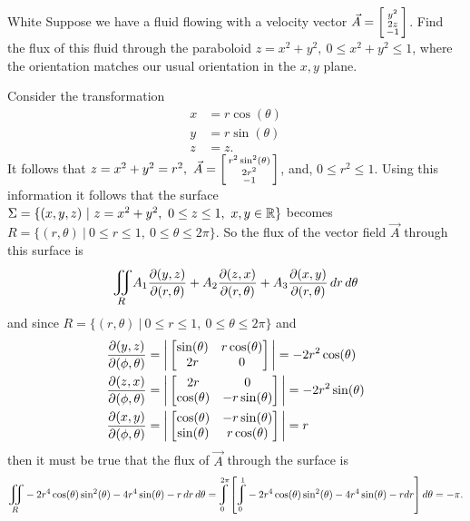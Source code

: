 \documentclass[titlepage]{article}
\begin{document}
\clearpage
\begin{cproblem}{4}{White}\vspace{-.5em}
Suppose we have a fluid flowing with a velocity vector $\vec{A} = \left[\begin{smallmatrix}y^2 \\ 2z \\ -1\end{smallmatrix}\right]$. Find the flux of this fluid through the paraboloid $z = x^2 + y^2, \ 0 \leq x^2 + y^2 \leq 1$, where the orientation matches our usual orientation in the $x,y$ plane.
\end{cproblem}
\begin{solution}
Consider the transformation \\
\begin{align*}
x &= r\cos(\theta) \\
y &= r\sin(\theta) \\
z &= z.
\end{align*}
It follows that $z = x^2 + y^2 = r^2, \ \vec{A} = \left[\begin{smallmatrix}r^2\sin^2(\theta) \\ 2r^2 \\ -1\end{smallmatrix}\right]$, and, $0\leq r^2 \leq 1.$ Using this information it follows that the surface $\Sigma = \{(x,y,z) \ | \ z = x^2 + y^2, \ 0\leq z \leq 1, \ x,y \in \mathbb{R}\}$ becomes $R = \{(r,\theta) \ | \ 0\leq r \leq 1, \ 0\leq \theta \leq 2\pi\}$. So the flux of the vector field $\vec{A}$ through this surface is
$$ \bigiint{R}{} A_1\frac{\p (y,z)}{\p (r,\theta)} + A_2 \frac{\p (z,x)}{\p (r,\theta)} + A_3 \frac{\p (x,y)}{\p (r,\theta)}\,dr \,d\theta$$
and since $R = \{(r,\theta) \ | \ 0\leq r \leq 1, \ 0\leq \theta \leq 2\pi\}$ and 
\begin{align*}
\frac{\p (y,z)}{\p (\phi,\theta)} &= \bigg|\bmat{\sin(\theta) & r\cos(\theta) \\ 2r & 0}\bigg| = -2r^2\cos(\theta) \\
\frac{\p (z,x)}{\p (\phi,\theta)} &= \bigg|\bmat{2r & 0 \\ \cos(\theta) & -r\sin(\theta)}\bigg| = -2r^2\sin(\theta) \\
\frac{\p (x,y)}{\p (\phi,\theta)} &= \bigg|\bmat{\cos(\theta) & -r\sin(\theta) \\ \sin(\theta) & r\cos(\theta)}\bigg| = r
\end{align*}
then it must be true that the flux of $\vec{A}$ through the surface is
$$\bigiint{R}{}-2r^4\cos(\theta)\sin^2(\theta) -4r^4\sin(\theta) -r \,dr \,d\theta = \mlvarint\limits_{0}^{2\pi} \left[\mlvarint\limits_{0}^{1}-2r^4\cos(\theta)\sin^2(\theta) -4r^4\sin(\theta) -r dr\right]d\theta = -\pi.$$
\end{solution}
\end{document}
